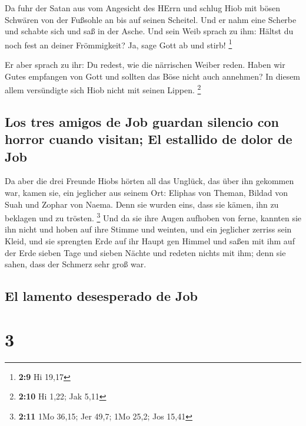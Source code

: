  Da fuhr der Satan aus vom Angesicht des HErrn und schlug
Hiob mit bösen Schwären von der Fußsohle an bis auf seinen Scheitel.
 Und er nahm eine Scherbe und schabte sich und saß in der
Asche.  Und sein Weib sprach zu ihm: Hältst du noch fest
an deiner Frömmigkeit? Ja, sage Gott ab und stirb! \footnote{\textbf{2:9}
  Hi 19,17}

 Er aber sprach zu ihr: Du redest, wie die närrischen
Weiber reden. Haben wir Gutes empfangen von Gott und sollten das Böse
nicht auch annehmen? In diesem allem versündigte sich Hiob nicht mit
seinen Lippen. \footnote{\textbf{2:10} Hi 1,22; Jak 5,11}

\hypertarget{los-tres-amigos-de-job-guardan-silencio-con-horror-cuando-visitan-el-estallido-de-dolor-de-job}{%
\subsection{Los tres amigos de Job guardan silencio con horror cuando
visitan; El estallido de dolor de
Job}\label{los-tres-amigos-de-job-guardan-silencio-con-horror-cuando-visitan-el-estallido-de-dolor-de-job}}

 Da aber die drei Freunde Hiobs hörten all das Unglück,
das über ihn gekommen war, kamen sie, ein jeglicher aus seinem Ort:
Eliphas von Theman, Bildad von Suah und Zophar von Naema. Denn sie
wurden eins, dass sie kämen, ihn zu beklagen und zu trösten. \footnote{\textbf{2:11}
  1Mo 36,15; Jer 49,7; 1Mo 25,2; Jos 15,41}  Und da sie
ihre Augen aufhoben von ferne, kannten sie ihn nicht und hoben auf ihre
Stimme und weinten, und ein jeglicher zerriss sein Kleid, und sie
sprengten Erde auf ihr Haupt gen Himmel  und saßen mit
ihm auf der Erde sieben Tage und sieben Nächte und redeten nichts mit
ihm; denn sie sahen, dass der Schmerz sehr groß war.

\hypertarget{el-lamento-desesperado-de-job}{%
\subsection{El lamento desesperado de
Job}\label{el-lamento-desesperado-de-job}}

\hypertarget{section-2}{%
\section{3}\label{section-2}}


